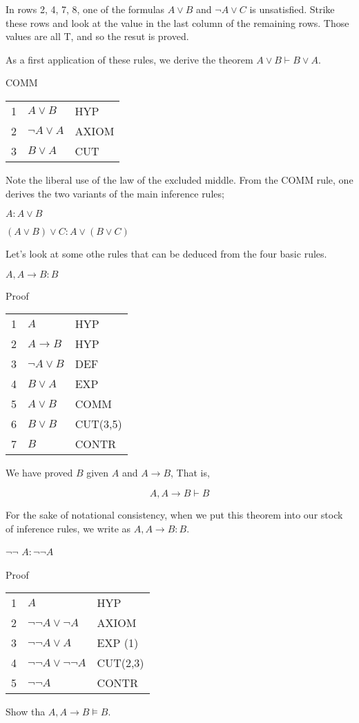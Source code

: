 In rows 2, 4, 7, 8, one of the formulas $A\lor B$ and $\neg A \lor C$ is unsatisfied.  Strike these rows and look at the value in the last column of the remaining rows.  Those values are all T, and so the resut is proved.

As a first application of these rules, we derive the theorem $A \lor B \vdash B \lor A$.

\begin{indent}
COMM
\begin{tabular}{lll}
1 & $A \lor B$ & HYP \\
2 & $\neg A \lor A$ & AXIOM \\
3 & $B \lor A$ & CUT \\
\end{tabular}
\end{indent}

Note the liberal use of the law of the excluded middle. From the COMM rule,
one derives the two variants of the main inference rules;

 $A : A \lor B$

 $(A \lor B) \lor C : A \lor (B  \lor C)$

Let's look at some othe rules that can be deduced from the
four basic rules.

 $A, A \to B : B$

\begin{indent}
Proof
\begin{tabular}{lll}
1 & $A$ & HYP \\
2 & $A \to B$ & HYP \\
3 & $\neg A \lor B$ & DEF \\
4 & $B \lor A$ & EXP \\
5 & $A \lor B$ & COMM \\
6 & $B \lor B$ & CUT(3,5) \\
7 & $B$ & CONTR \\
\end{tabular}
\end{indent}

We have proved $B$ given $A$ and $A \to B$,  That is,

$$
A, A \to B \vdash B
$$

For the sake of notational consistency, when we put this theorem into our stock of inference rules, we write as $A, A \to B : B$.

$\neg \neg$  $A : \neg \neg A$


\begin{indent}
Proof
\begin{tabular}{lll}
1 & $A$ & HYP \\
2 & $\neg \neg A \lor \neg A$ & AXIOM  \\
3 & $\neg \neg A \lor A$ & EXP (1) \\
4 &  $\neg \neg A \lor \neg \neg A$ & CUT(2,3) \\
5 & $\neg \neg A $ & CONTR \\
\end{tabular}
\end{indent}
\begin{exercise}
Show tha $A, A \to B \models B$.
\end{exercise}


